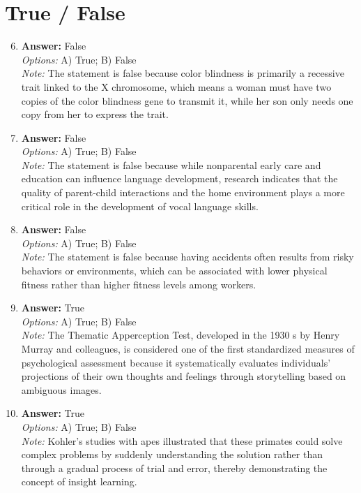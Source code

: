 \documentclass[12pt]{article}
\begin{document}
\section*{True / False}
\begin{enumerate}[label=\arabic*.]
\setcounter{enumi}{5}
\item \textbf{Answer:} False
\\ \textit{Options:} A) True; B) False
\\ \textit{Note:} The statement is false because color blindness is primarily a recessive trait linked to the X chromosome, which means a woman must have two copies of the color blindness gene to transmit it, while her son only needs one copy from her to express the trait.
\item \textbf{Answer:} False
\\ \textit{Options:} A) True; B) False
\\ \textit{Note:} The statement is false because while nonparental early care and education can influence language development, research indicates that the quality of parent-child interactions and the home environment plays a more critical role in the development of vocal language skills.
\item \textbf{Answer:} False
\\ \textit{Options:} A) True; B) False
\\ \textit{Note:} The statement is false because having accidents often results from risky behaviors or environments, which can be associated with lower physical fitness rather than higher fitness levels among workers.
\item \textbf{Answer:} True
\\ \textit{Options:} A) True; B) False
\\ \textit{Note:} The Thematic Apperception Test, developed in the 1930 s by Henry Murray and colleagues, is considered one of the first standardized measures of psychological assessment because it systematically evaluates individuals' projections of their own thoughts and feelings through storytelling based on ambiguous images.
\item \textbf{Answer:} True
\\ \textit{Options:} A) True; B) False
\\ \textit{Note:} Kohler's studies with apes illustrated that these primates could solve complex problems by suddenly understanding the solution rather than through a gradual process of trial and error, thereby demonstrating the concept of insight learning.
\end{enumerate}
\end{document}
